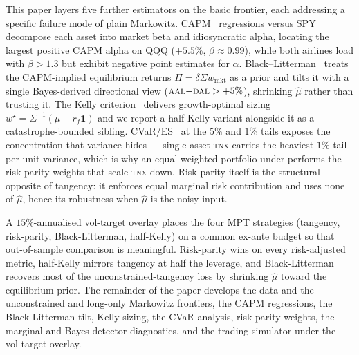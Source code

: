 \documentclass[runningheads]{llncs}
\begin{document}
This paper layers five further estimators on the basic frontier, each
addressing a specific failure mode of plain Markowitz.
CAPM~\cite{sharpe1964capm,lintner1965} regressions versus SPY
decompose each asset into market beta and idiosyncratic alpha,
locating the largest positive CAPM alpha on QQQ ($+5.5\%$,
$\beta\!\approx\!0.99$), while both airlines load with $\beta>1.3$
but exhibit negative point estimates for $\alpha$. Black--Litterman~\cite{black1992,he1999bl}
treats the CAPM-implied equilibrium returns
$\Pi=\delta\Sigma w_{\mathrm{mkt}}$ as a prior and tilts it with a
single Bayes-derived directional view
($\textsc{aal}{-}\textsc{dal}>{+}5\%$), shrinking $\hat\mu$
rather than trusting it. The Kelly criterion~\cite{kelly1956}
delivers growth-optimal sizing
$w^{\star}=\Sigma^{-1}(\mu-r_f\mathbf{1})$ and we report a half-Kelly
variant alongside it as a catastrophe-bounded sibling.
CVaR/ES~\cite{rockafellar2000} at the $5\%$ and $1\%$ tails exposes
the concentration that variance hides --- single-asset \textsc{tnx}
carries the heaviest $1\%$-tail per unit variance, which is why an
equal-weighted portfolio under-performs the risk-parity weights that
scale \textsc{tnx} down. Risk parity itself is the structural
opposite of tangency: it enforces equal marginal risk contribution
and uses none of $\hat\mu$, hence its robustness when $\hat\mu$ is
the noisy input.

A $15\%$-annualised vol-target overlay places the four MPT
strategies (tangency, risk-parity, Black-Litterman, half-Kelly) on a
common ex-ante budget so that out-of-sample comparison is meaningful.
Risk-parity wins on every risk-adjusted metric, half-Kelly mirrors
tangency at half the leverage, and Black-Litterman recovers most of
the unconstrained-tangency loss by shrinking $\hat\mu$ toward the
equilibrium prior. The remainder of the paper develops the data and
the unconstrained and long-only Markowitz frontiers, the CAPM
regressions, the Black-Litterman tilt, Kelly sizing, the CVaR
analysis, risk-parity weights, the marginal and Bayes-detector
diagnostics, and the trading simulator under the vol-target overlay.

\end{document}
